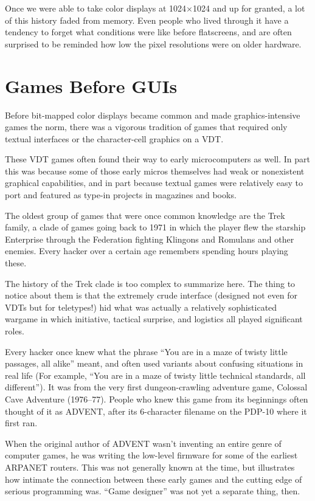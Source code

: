 \documentclass[10pt]{article}
\newcommand{\mc}{\small}
\newcommand{\acro}[1]{{\mc #1\spacefactor1000}}
\begin{document}
Once we were able to take color displays at 1024$\times$1024 and up for granted, a lot
of this history faded from memory. Even people who lived through it have a
tendency to forget what conditions were like before flatscreens, and are often
surprised to be reminded how low the pixel resolutions were on older hardware.

\section{Games Before GUIs}
Before bit-mapped color displays became common and made graphics-intensive
games the norm, there was a vigorous tradition of games that required only
textual interfaces or the character-cell graphics on a \acro{VDT}.

These \acro{VDT} games often found their way to early microcomputers as well. In part
this was because some of those early micros themselves had weak or nonexistent
graphical capabilities, and in part because textual games were relatively easy
to port and featured as type-in projects in magazines and books.

The oldest group of games that were once common knowledge are the Trek family,
a clade of games going back to 1971 in which the player flew the starship
Enterprise through the Federation fighting Klingons and Romulans and other
enemies. Every hacker over a certain age remembers spending hours playing
these.

The history of the Trek clade is too complex to summarize here. The thing to
notice about them is that the extremely crude interface (designed not even for
\acro{VDT}s but for teletypes!) hid what was actually a relatively sophisticated
wargame in which initiative, tactical surprise, and logistics all played
significant roles.

Every hacker once knew what the phrase ``You are in a maze of twisty little
passages, all alike'' meant, and often used variants about confusing situations
in real life (For example, ``You are in a maze of twisty little technical
standards, all different''). It was from the very first dungeon-crawling
adventure game, Colossal Cave Adventure (1976--77). People who knew this game
from its beginnings often thought of it as \acro{ADVENT}, after its 6-character
filename on the \acro{PDP-10} where it first ran.

When the original author of \acro{ADVENT} wasn't inventing an entire genre of computer
games, he was writing the low-level firmware for some of the earliest \acro{ARPANET}
routers. This was not generally known at the time, but illustrates how intimate
the connection between these early games and the cutting edge of serious
programming was. ``Game designer'' was not yet a separate thing, then.
\end{document}
